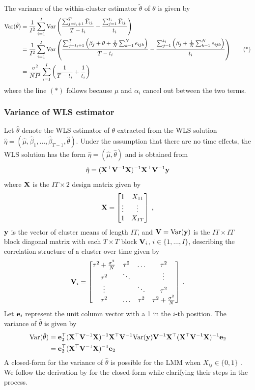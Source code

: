 \documentclass[10pt]{article}
\begin{document}
The variance of the within-cluster estimator $\tilde{\theta}$ of $\theta$ is given by
\begin{align*}
\mathrm{Var}(\tilde{\theta}) &= \frac{1}{I^2}\sum_{i=1}^I\mathrm{Var}\left(\frac{\sum_{j=t_i+1}^T\bar{Y}_{ij.}}{T-t_i} - \frac{\sum_{j=1}^{t_i}\bar{Y}_{ij.}}{t_i}\right) \\
&= \frac{1}{I^2}\sum_{i=1}^I\mathrm{Var}\left(\frac{\sum_{j=t_i+1}^T\left(\beta_j+\theta+\frac{1}{N}\sum_{k=1}^Ne_{ijk}\right)}{T-t_i} - \frac{\sum_{j=1}^{t_i}\left(\beta_j+\frac{1}{N}\sum_{k=1}^Ne_{ijk}\right)}{t_i}\right) \tag{*} \\
&= \frac{\sigma^2}{NI^2}\sum_{i=1}^I\left(\frac{1}{T-t_i} + \frac{1}{t_i}\right)
\end{align*}
where the line $(*)$ follows because $\mu$ and $\alpha_i$ cancel out between the two terms.

\subsubsection{Variance of WLS estimator}

Let $\hat{\theta}$ denote the WLS estimator of $\theta$ extracted from the WLS solution $\hat{\eta}=(\hat{\mu},\hat{\beta}_1,\ldots,\hat{\beta}_{T-1},\hat{\theta})$. Under the assumption that there are no time effects, the WLS solution has the form $\hat{\eta} = (\hat{\mu},\hat{\theta})$ and is obtained from
\[
\hat{\eta} = (\mathbf{X}^\top\mathbf{V}^{-1}\mathbf{X})^{-1}\mathbf{X}^\top\mathbf{V}^{-1}\mathbf{y}
\]
where $\mathbf{X}$ is the $IT\times 2$ design matrix given by
\[
\mathbf{X} =
\begin{bmatrix}
1 & X_{11} \\
\vdots & \vdots \\
1 & X_{IT}
\end{bmatrix}\;,
\]
$\mathbf{y}$ is the vector of cluster means of length $IT$, and $\mathbf{V}=\mathrm{Var}(\mathbf{y})$ is the $IT\times IT$ block diagonal matrix with each $T\times T$ block $\mathbf{V}_i$, $i\in\{1,\ldots,I\}$, describing the correlation structure of a cluster over time given by
\[
\mathbf{V}_i =
\begin{bmatrix}
\tau^2 + \frac{\sigma^2}{N} & \tau^2 & \ldots & \tau^2 \\
\tau^2 & \ddots & & \vdots \\
\vdots & & \ddots & \tau^2 \\
\tau^2 & \ldots & \tau^2 & \tau^2 + \frac{\sigma^2}{N}
\end{bmatrix}\;.
\]
Let $\mathbf{e}_i$ represent the unit column vector with a 1 in the $i$-th position. The variance of $\hat{\theta}$ is given by
\begin{align*}
\mathrm{Var}(\hat{\theta}) &= \mathbf{e}_2^\top(\mathbf{X}^\top\mathbf{V}^{-1}\mathbf{X})^{-1}\mathbf{X}^\top\mathbf{V}^{-1}\mathrm{Var}(\mathbf{y})\mathbf{V}^{-1}\mathbf{X}^\top(\mathbf{X}^\top\mathbf{V}^{-1}\mathbf{X})^{-1}\mathbf{e}_2 \\
&= \mathbf{e}_2^\top(\mathbf{X}^\top\mathbf{V}^{-1}\mathbf{X})^{-1}\mathbf{e}_2
\end{align*}
A closed-form for the variance of $\hat{\theta}$ is possible for the LMM when $X_{ij}\in\{0,1\}$ \parencite{Hussey:2007}. We follow the derivation by \textcite{Liao:2015} for the closed-form while clarifying their steps in the process.
\\
\end{document}
